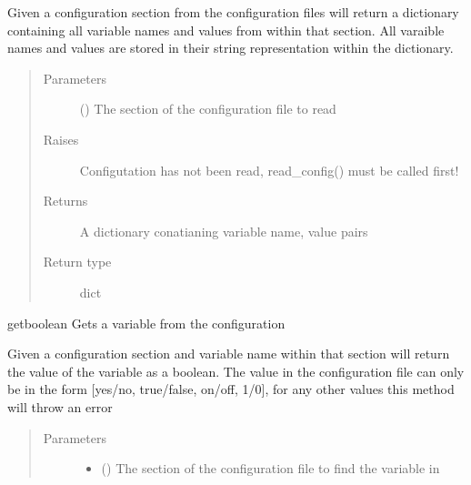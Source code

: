 \documentclass[letterpaper,10pt,english]{sphinxmanual}
\begin{document}
\begin{fulllineitems}
\begin{fulllineitems}
Given a configuration section from the configuration files
will return a dictionary containing all variable names and
values from within that section. All varaible names and values
are stored in their string representation within the dictionary.
\begin{quote}\begin{description}
\item[{Parameters}] \leavevmode
{} () \textendash{} The section of the configuration file to read

\item[{Raises}] \leavevmode
{} \textendash{} Configutation has not been read, read\_config() must be called first!

\item[{Returns}] \leavevmode
A dictionary conatianing variable name, value pairs

\item[{Return type}] \leavevmode
dict

\end{description}\end{quote}

\end{fulllineitems}


\begin{fulllineitems}
\label{\detokenize{index:config.config_manager.Config.getboolean}}
getboolean Gets a variable from the configuration

Given a configuration section and variable name within that section
will return the value of the variable as a boolean. The value in the
configuration file can only be in the form {[}yes/no, true/false, on/off, 1/0{]},
for any other values this method will throw an error
\begin{quote}\begin{description}
\item[{Parameters}] \leavevmode\begin{itemize}
\item {} 
 () \textendash{} The section of the configuration file to find the variable in


\end{itemize}
\end{description}
\end{quote}
\end{fulllineitems}
\end{fulllineitems}
\end{document}
